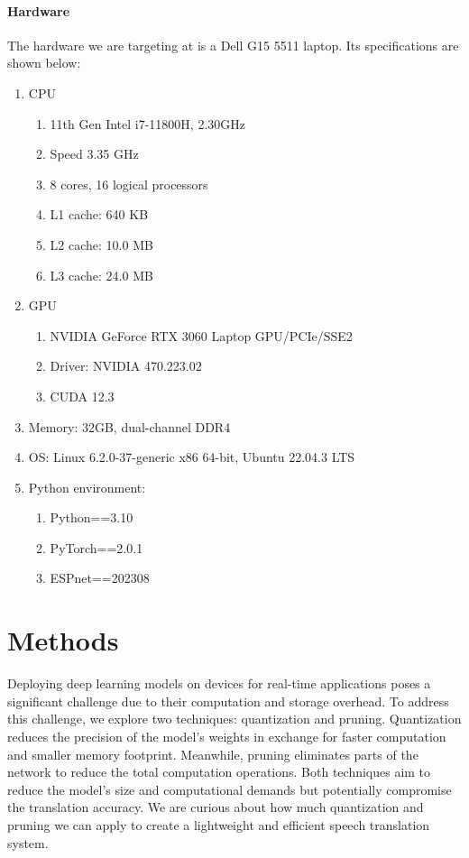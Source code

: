\documentclass[11pt]{article}
\begin{document}
\paragraph{Hardware} The hardware we are targeting at is a Dell G15 5511 laptop. Its specifications are shown below:
\begin{enumerate}
    \item CPU
    \begin{enumerate}
        \item 11th Gen Intel i7-11800H, 2.30GHz
        \item Speed 3.35 GHz
        \item 8 cores, 16 logical processors
        \item L1 cache: 640 KB
        \item L2 cache: 10.0 MB
        \item L3 cache: 24.0 MB
    \end{enumerate}
    \item GPU
    \begin{enumerate}
        \item NVIDIA GeForce RTX 3060 Laptop GPU/PCIe/SSE2  
        \item Driver: NVIDIA 470.223.02
        \item CUDA 12.3
    \end{enumerate}
    \item Memory: 32GB, dual-channel DDR4
    \item OS: Linux 6.2.0-37-generic x86 64-bit, Ubuntu 22.04.3 LTS
    \item Python environment:
    \begin{enumerate}
        \item Python==3.10
        \item PyTorch==2.0.1
        \item ESPnet==202308
    \end{enumerate}
\end{enumerate}




\section{Methods}

Deploying deep learning models on devices for real-time applications poses a significant challenge due to their computation and storage overhead. To address this challenge, we explore two techniques: quantization and pruning.
Quantization reduces the precision of the model’s weights in exchange for faster computation and smaller memory footprint. Meanwhile, pruning eliminates parts of the network to reduce the total computation operations. Both techniques aim to reduce the model’s size and computational demands but potentially compromise the translation accuracy.
We are curious about how much quantization and pruning we can apply to create a lightweight and efficient speech translation system.
\end{document}
